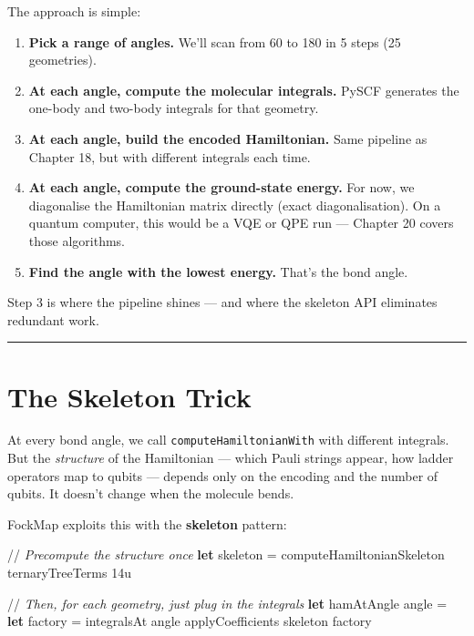 \documentclass[
  11pt,
  oneside]{book}
\newenvironment{Shaded}{\begin{snugshade}}{\end{snugshade}}
\newcommand{\CommentTok}[1]{\textcolor[rgb]{0.56,0.35,0.01}{\textit{#1}}}
\newcommand{\DecValTok}[1]{\textcolor[rgb]{0.00,0.00,0.81}{#1}}
\newcommand{\KeywordTok}[1]{\textcolor[rgb]{0.13,0.29,0.53}{\textbf{#1}}}
\newcommand{\NormalTok}[1]{#1}
\providecommand{\tightlist}{%
  \setlength{\itemsep}{0pt}\setlength{\parskip}{0pt}}
\begin{document}
The approach is simple:

\begin{enumerate}
\def\labelenumi{\arabic{enumi}.}
\tightlist
\item
  \textbf{Pick a range of angles.} We'll scan from 60\textdegree{} to 180\textdegree{} in 5\textdegree{}
  steps (25 geometries).
\item
  \textbf{At each angle, compute the molecular integrals.} PySCF
  generates the one-body and two-body integrals for that geometry.
\item
  \textbf{At each angle, build the encoded Hamiltonian.} Same pipeline
  as Chapter 18, but with different integrals each time.
\item
  \textbf{At each angle, compute the ground-state energy.} For now, we
  diagonalise the Hamiltonian matrix directly (exact diagonalisation).
  On a quantum computer, this would be a VQE or QPE run --- Chapter 20
  covers those algorithms.
\item
  \textbf{Find the angle with the lowest energy.} That's the bond angle.
\end{enumerate}

Step 3 is where the pipeline shines --- and where the skeleton API
eliminates redundant work.

\begin{center}\rule{0.5\linewidth}{0.5pt}\end{center}

\section{The Skeleton Trick}\label{the-skeleton-trick}

At every bond angle, we call \texttt{computeHamiltonianWith} with
different integrals. But the \emph{structure} of the Hamiltonian ---
which Pauli strings appear, how ladder operators map to qubits ---
depends only on the encoding and the number of qubits. It doesn't change
when the molecule bends.

FockMap exploits this with the \textbf{skeleton} pattern:

\begin{Shaded}
\begin{Highlighting}[]
\NormalTok{//}\CommentTok{ Precompute the structure once}
\KeywordTok{let}\NormalTok{ skeleton = computeHamiltonianSkeleton ternaryTreeTerms }\DecValTok{14}\NormalTok{u}

\NormalTok{//}\CommentTok{ Then, for each geometry, just plug in the integrals}
\KeywordTok{let}\NormalTok{ hamAtAngle angle =}
    \KeywordTok{let}\NormalTok{ factory = integralsAt angle}
\NormalTok{    applyCoefficients skeleton factory}
\end{Highlighting}
\end{Shaded}
\end{document}
